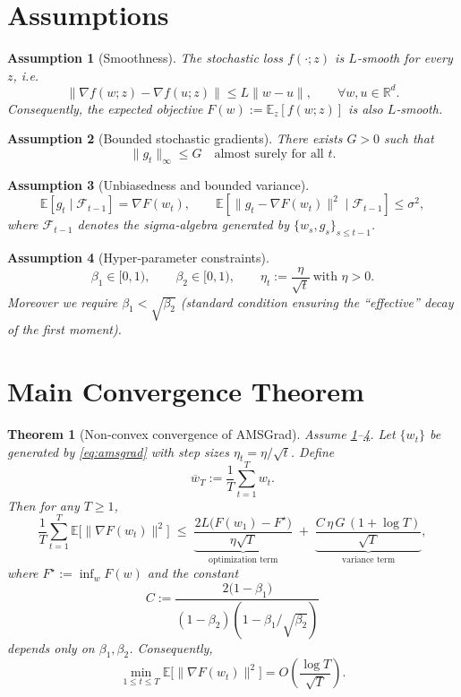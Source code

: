 \documentclass{article}
\newtheorem{theorem}{Theorem}
\newtheorem{assumption}{Assumption}
\begin{document}
\section*{Assumptions}
\begin{assumption}[Smoothness]\label{as:smooth}
The stochastic loss $f(\cdot;z)$ is $L$‑smooth for every $z$, i.e.
\[
\|\nabla f(w;z)-\nabla f(u;z)\|\le L\|w-u\|,\qquad\forall w,u\in\mathbb{R}^d.
\]
Consequently, the expected objective $F(w):=\mathbb{E}_z[f(w;z)]$ is also $L$‑smooth.
\end{assumption}
\begin{assumption}[Bounded stochastic gradients]\label{as:bounded}
There exists $G>0$ such that
\[
\|g_t\|_\infty\le G\quad\text{almost surely for all }t.
\]
\end{assumption}
\begin{assumption}[Unbiasedness and bounded variance]\label{as:unbiased}
\[
\mathbb{E}\!\left[g_t\mid\mathcal{F}_{t-1}\right]=\nabla F(w_t),\qquad
\mathbb{E}\!\left[\|g_t-\nabla F(w_t)\|^2\mid\mathcal{F}_{t-1}\right]\le\sigma^2,
\]
where $\mathcal{F}_{t-1}$ denotes the sigma‑algebra generated by $\{w_s,g_s\}_{s\le t-1}$.
\end{assumption}
\begin{assumption}[Hyper‑parameter constraints]\label{as:params}
\[
\beta_1\in[0,1),\qquad \beta_2\in[0,1),\qquad
\eta_t:=\frac{\eta}{\sqrt{t}}\ \text{with }\eta>0.
\]
Moreover we require $\beta_1<\sqrt{\beta_2}$ (standard condition ensuring the “effective” decay of the first moment).
\end{assumption}

\section*{Main Convergence Theorem}
\begin{theorem}[Non‑convex convergence of AMSGrad]\label{thm:main}
Assume \ref{as:smooth}–\ref{as:params}.  Let $\{w_t\}$ be generated by \eqref{eq:amsgrad} with step sizes $\eta_t=\eta/\sqrt{t}$.  Define
\[
\overline{w}_T:=\frac{1}{T}\sum_{t=1}^{T}w_t .
\]
Then for any $T\ge 1$,
\[
\frac{1}{T}\sum_{t=1}^{T}\mathbb{E}\!\bigl[\|\nabla F(w_t)\|^2\bigr]
\;\le\;
\underbrace{\frac{2L\bigl(F(w_1)-F^\star\bigr)}{\eta\sqrt{T}}}_{\text{optimization term}}
\;+\;
\underbrace{\frac{C\,\eta\, G\,(1+\log T)}{\sqrt{T}}}_{\text{variance term}},
\]
where $F^\star:=\inf_wF(w)$ and the constant
\[
C:=\frac{2\bigl(1-\beta_1\bigr)}{(1-\beta_2)(1-\beta_1/\sqrt{\beta_2})}
\]
depends only on $\beta_1,\beta_2$.  Consequently,
\[
\min_{1\le t\le T}\mathbb{E}\!\bigl[\|\nabla F(w_t)\|^2\bigr]
= O\!\left(\frac{\log T}{\sqrt{T}}\right).
\]
\end{theorem}
\end{document}
